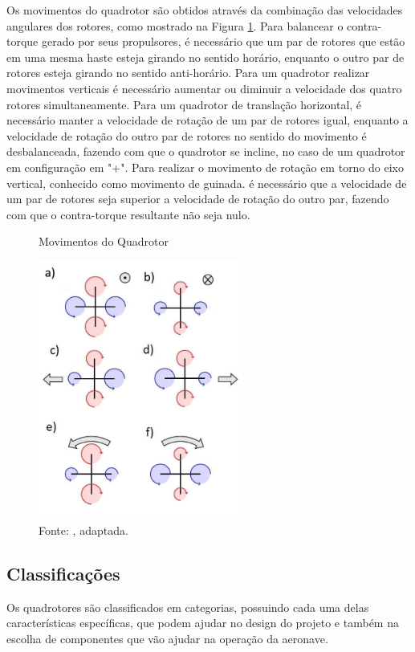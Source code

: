 Os movimentos do quadrotor são obtidos através da combinação das velocidades angulares dos rotores, como mostrado na Figura \ref{fig:movimentos}. Para balancear o contra-torque gerado por seus propulsores, é necessário que um par de rotores que estão em uma mesma haste esteja girando no sentido horário, enquanto o outro par de rotores esteja girando no sentido anti-horário. Para um quadrotor realizar movimentos verticais é necessário aumentar ou diminuir a velocidade dos quatro rotores simultaneamente. Para um quadrotor de translação horizontal, é necessário manter a velocidade de rotação de um par de rotores igual, enquanto a velocidade de rotação do outro par de rotores no sentido do movimento é desbalanceada, fazendo com que o quadrotor se incline, no caso de um quadrotor em configuração em "+". Para realizar o movimento de rotação em torno do eixo vertical, conhecido como movimento de guinada. é necessário que a velocidade de um par de rotores seja superior a velocidade de rotação do outro par, fazendo com que o contra-torque resultante não seja nulo. \cite{Bouabdallah2007}

\begin{figure} [h!]	
  \centering
  \caption{Movimentos do Quadrotor}
  \includegraphics[width=0.6\textwidth]{Figures/Screenshot from 2021-12-14 15-46-58.png}
  \caption*{Fonte: \cite{monteiro2015modelagem}, adaptada.}
  \label{fig:movimentos}
\end{figure}

\subsection{Classificações}
Os quadrotores são classificados em categorias, possuindo cada uma delas características específicas, que podem ajudar no design do projeto e também na escolha de componentes que vão ajudar na operação da aeronave.

